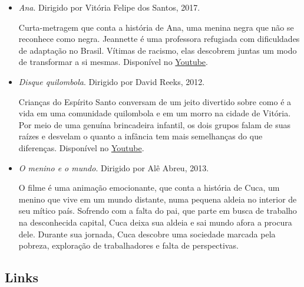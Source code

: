 \documentclass[11pt]{extarticle}
\begin{document}
\begin{itemize}

\item \textit{Ana}. Dirigido por Vitória Felipe dos Santos, 2017.

Curta-metragem que conta a história de Ana, uma menina negra que não se reconhece como negra. Jeannette é uma professora refugiada com dificuldades de adaptação no Brasil. Vítimas de racismo, elas descobrem juntas um modo de transformar a si mesmas. Disponível no \href{https://youtu.be/MO1f8n3gMG8}{Youtube}.

\item \textit{Disque quilombola}. Dirigido por David Reeks, 2012.

Crianças do Espírito Santo conversam de um jeito divertido sobre como é a vida em uma comunidade quilombola e em um morro na cidade de Vitória. Por meio de uma genuína brincadeira infantil, os dois grupos falam de suas raízes e desvelam o quanto a infância tem mais semelhanças do que diferenças. Disponível no \href{https://youtu.be/GStv-f_bcfU}{Youtube}.

\item \textit{O menino e o mundo}. Dirigido por Alê Abreu, 2013.

O filme é uma animação emocionante, que conta a história de Cuca, um menino que vive em um mundo distante, numa pequena aldeia no interior de seu mítico país. Sofrendo com a falta do pai, que parte em busca de trabalho na desconhecida capital, Cuca deixa sua aldeia e sai mundo afora a procura dele. Durante sua jornada, Cuca descobre uma sociedade marcada pela pobreza, exploração de trabalhadores e falta de perspectivas.

\end{itemize}

\subsection{Links}
\end{document}
